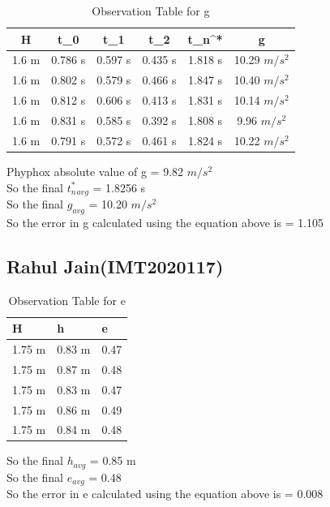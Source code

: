 \documentclass[11pt]{scrartcl} %
\begin{document}
\begin{table}[h]
\centering
\begin{tabular}{||c c c c c c||} 
\toprule
 \hline
 H & t_0 & t_1 & t_2 & t_n^* & g \\ [0.5ex] 
 \midrule
 \hline\hline
 1.6 m & 0.786 s & 0.597 s  & 0.435 s & 1.818 s & 10.29 $m/s^2$ \\
 \hline
 1.6 m & 0.802 s & 0.579 s & 0.466 s & 1.847 s & 10.40 $m/s^2$  \\
 \hline
 1.6 m & 0.812 s & 0.606 s & 0.413 s & 1.831 s  & 10.14 $m/s^2$ \\
 \hline
 1.6 m & 0.831 s & 0.585 s & 0.392 s & 1.808 s  & 9.96 $m/s^2$  \\
 \hline
 1.6 m & 0.791 s & 0.572 s & 0.461 s & 1.824 s  & 10.22 $m/s^2$ \\ [1ex]
 \bottomrule
 \hline
\end{tabular}
\caption{Observation Table for g}
\end{table}
Phyphox absolute value of g = 9.82 $m/s^2$\\
So the final $t_n^*_{avg}$ = 1.8256 s\\
So the final $g_{avg}$ = 10.20 $m/s^2$\\
So the error in g calculated using the equation above is  = 1.105 \\

\newpage
\subsection{Rahul Jain(IMT2020117)}

\begin{table}[h] %
	\centering %
	\begin{tabular}{l l l}
		\toprule
		\textbf{H} & \textbf{h} & \textbf{e} \\
		\midrule
		1.75 m & 0.83 m & 0.47\\
        1.75 m & 0.87 m  & 0.48\\
        1.75 m & 0.83 m  & 0.47\\
        1.75 m & 0.86 m & 0.49 \\
        1.75 m & 0.84 m & 0.48 \\
		\bottomrule
	\end{tabular}
	\caption{Observation Table for e}
\end{table}
So the final $h_{avg}$ = 0.85 m\\
So the final $e_{avg}$ = 0.48\\
So the error in e calculated using the equation above is  = 0.008
\end{document}
